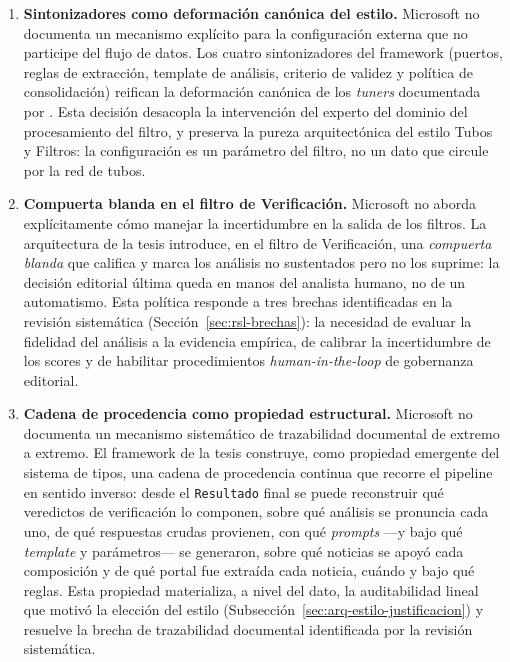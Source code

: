 \begin{enumerate}
  \item \textbf{Sintonizadores como deformación canónica del estilo.}
        Microsoft no documenta un mecanismo explícito para la configuración
        externa que no participe del flujo de datos. Los cuatro sintonizadores
        del framework (puertos, reglas de extracción, template de análisis,
        criterio de validez y política de consolidación) reifican la
        deformación canónica de los \textit{tuners} documentada por
        \citet[§3.13.2]{cristia:2025}. Esta decisión desacopla la intervención
        del experto del dominio del procesamiento del filtro, y preserva la
        pureza arquitectónica del estilo Tubos y Filtros: la configuración
        es un parámetro del filtro, no un dato que circule por la red de
        tubos.

  \item \textbf{Compuerta blanda en el filtro de Verificación.}
        Microsoft no aborda explícitamente cómo manejar la incertidumbre en
        la salida de los filtros. La arquitectura de la tesis introduce, en
        el filtro de Verificación, una \textit{compuerta blanda} que califica
        y marca los análisis no sustentados pero no los suprime: la decisión
        editorial última queda en manos del analista humano, no de un
        automatismo. Esta política responde a tres brechas identificadas en
        la revisión sistemática (Sección~\ref{sec:rsl-brechas}): la necesidad
        de evaluar la fidelidad del análisis a la evidencia empírica, de
        calibrar la incertidumbre de los scores y de habilitar procedimientos
        \textit{human-in-the-loop} de gobernanza editorial.

  \item \textbf{Cadena de procedencia como propiedad estructural.}
        Microsoft no documenta un mecanismo sistemático de trazabilidad
        documental de extremo a extremo. El framework de la tesis
        construye, como propiedad emergente del sistema de tipos, una cadena
        de procedencia continua que recorre el pipeline en sentido inverso:
        desde el \texttt{Resultado} final se puede reconstruir qué
        veredictos de verificación lo componen, sobre qué análisis se
        pronuncia cada uno, de qué respuestas crudas provienen, con qué
        \textit{prompts} ---y bajo qué \textit{template} y parámetros--- se
        generaron, sobre qué noticias se apoyó cada composición y de qué
        portal fue extraída cada noticia, cuándo y bajo qué reglas. Esta
        propiedad materializa, a nivel del dato, la auditabilidad lineal
        que motivó la elección del estilo (Subsección~\ref{sec:arq-estilo-justificacion})
        y resuelve la brecha de trazabilidad documental identificada por
        la revisión sistemática.


\end{enumerate}
